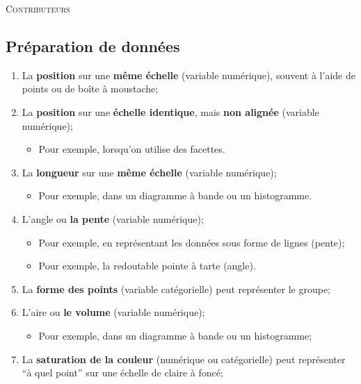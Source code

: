 \documentclass[10pt, french]{article}
\begin{document}
\begin{center}
	\textsc{\Large Contributeurs}\\[0.5cm] 
\end{center}


\newpage

\raggedcolumns
\begin{multicols*}{3} 

\section{Préparation de données}

\begin{algo2}
\begin{enumerate}[leftmargin = *]
	\item	La \textbf{position} sur une \textbf{même échelle} (variable numérique), souvent à l’aide de points ou de boîte à moustache;
	\item	La \textbf{position} sur une \textbf{échelle identique}, mais \textbf{non alignée} (variable numérique);
		\begin{itemize}
		\item	Pour exemple, lorsqu’on utilise des facettes.
		\end{itemize}
	\item	La \textbf{longueur} sur une \textbf{même échelle} (variable numérique);
		\begin{itemize}
		\item	Pour exemple, dans un diagramme à bande ou un histogramme.
		\end{itemize}
	\item	L’angle ou \textbf{la pente} (variable numérique);
		\begin{itemize}
		\item	Pour exemple, en représentant les données sous forme de lignes (pente);
		\item	Pour exemple, la redoutable pointe à tarte (angle).
		\end{itemize}
	\item	La \textbf{forme des points} (variable catégorielle) peut représenter le groupe;
	\item	L’aire ou \textbf{le volume} (variable numérique);
		\begin{itemize}
		\item	Pour exemple, dans un diagramme à bande ou un histogramme;
		\end{itemize}
	\item	La \textbf{saturation de la couleur} (numérique ou catégorielle) peut représenter “à quel point” sur une échelle de claire à foncé;

\end{enumerate}
\end{algo2}
\end{multicols*}
\end{document}
